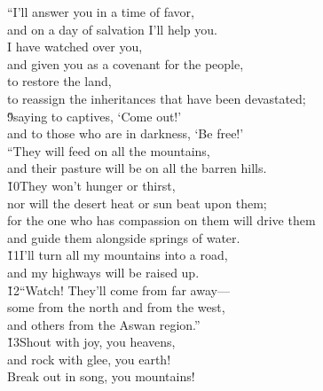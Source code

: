 \begin{poetry}
\poeml ``I'll answer you in a time of favor, \\
\poemll    and on a day of salvation I'll help you. \\
\poeml I have watched over you, \\
\poemll    and given you as a covenant for the people, \\
\poeml to restore the land, \\
\poemll    to reassign the inheritances that have been devastated; \\
\poeml \v{9}saying to captives, `Come out!' \\
\poemll    and to those who are in darkness, `Be free!' \\
\poeml ``They will feed on all the mountains, \\
\poemll    and their pasture will be on all the barren hills. \\
\poeml \v{10}They won't hunger or thirst, \\
\poemll    nor will the desert heat or sun beat upon them; \\
\poeml for the one who has compassion on them will drive them \\
\poemll    and guide them alongside springs of water. \\
\poeml \v{11}I'll turn all my mountains into a road, \\
\poemll    and my highways will be raised up. \\
\poeml \v{12}``Watch! They'll come from far away--- \\
\poemll    some from the north and from the west, \\
\poemlll       and others from the Aswan region.'' \\
\poeml \v{13}Shout with joy, you heavens, \\
\poemll    and rock with glee, you earth! \\
\poemlll       Break out in song, you mountains! \\

\end{poetry}
